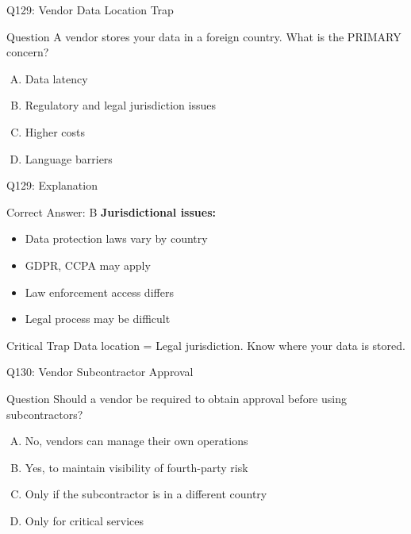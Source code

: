 \documentclass{beamer}
\begin{document}
	\begin{frame}{Q129: Vendor Data Location Trap}
		\begin{block}{Question}
			A vendor stores your data in a foreign country. What is the PRIMARY concern?
		\end{block}
		\begin{enumerate}[(A)]
			\item Data latency
			\item Regulatory and legal jurisdiction issues
			\item Higher costs
			\item Language barriers
		\end{enumerate}
	\end{frame}
	
	\begin{frame}{Q129: Explanation}
		\begin{block}{Correct Answer: B}
			\textbf{Jurisdictional issues:}
			\begin{itemize}
				\item Data protection laws vary by country
				\item GDPR, CCPA may apply
				\item Law enforcement access differs
				\item Legal process may be difficult
			\end{itemize}
		\end{block}
		\begin{alertblock}{Critical Trap}
			Data location = Legal jurisdiction.
			Know where your data is stored.
		\end{alertblock}
	\end{frame}
	
	\begin{frame}{Q130: Vendor Subcontractor Approval}
		\begin{block}{Question}
			Should a vendor be required to obtain approval before using subcontractors?
		\end{block}
		\begin{enumerate}[(A)]
			\item No, vendors can manage their own operations
			\item Yes, to maintain visibility of fourth-party risk
			\item Only if the subcontractor is in a different country
			\item Only for critical services
		\end{enumerate}
	\end{frame}
	
\end{document}
